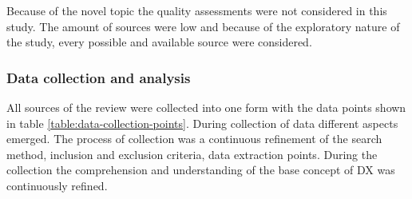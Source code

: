\documentclass[english, 12pt, a4paper, sci, utf8, a-1b, online]{aaltothesis}
\begin{document}
Because of the novel topic the quality assessments were not considered in this study. The amount of sources were low and because of the exploratory nature of the study, every possible and available source were considered.

\subsubsection{Data collection and analysis}

All sources of the review were collected into one form with the data points shown in table \ref{table:data-collection-points}. During collection of data different aspects emerged. The process of collection was a continuous refinement of the search method, inclusion and exclusion criteria, data extraction points. During the collection the comprehension and understanding of the base concept of DX was continuously refined.
\end{document}
